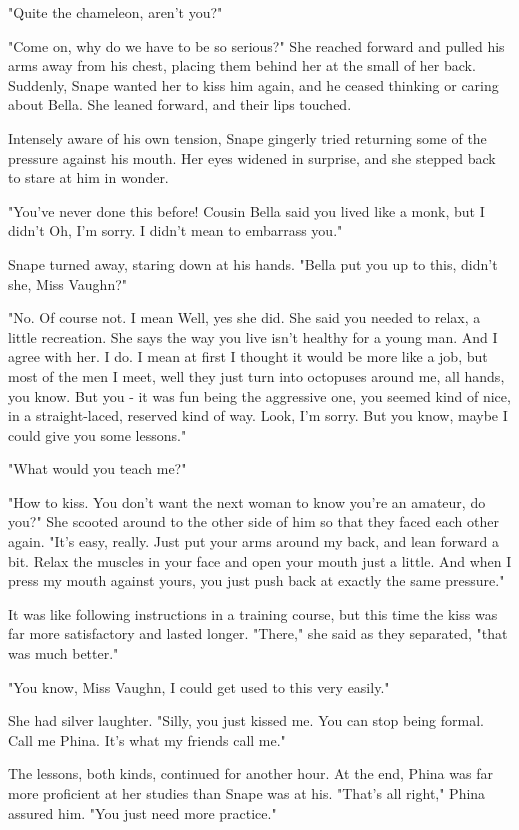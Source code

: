 "Quite the chameleon, aren't you?"

"Come on, why do we have to be so serious?" She reached forward and pulled his arms away from his chest, placing them behind her at the small of her back. Suddenly, Snape wanted her to kiss him again, and he ceased thinking or caring about Bella. She leaned forward, and their lips touched.

Intensely aware of his own tension, Snape gingerly tried returning some of the pressure against his mouth. Her eyes widened in surprise, and she stepped back to stare at him in wonder.

"You've never done this before! Cousin Bella said you lived like a monk, but I didn't{\el} Oh, I'm sorry. I didn't mean to embarrass you."

Snape turned away, staring down at his hands. "Bella put you up to this, didn't she, Miss Vaughn?"

"No. Of course not. I mean{\el} Well, yes she did. She said you needed to relax, a little recreation. She says the way you live isn't healthy for a young man. And I agree with her. I do. I mean at first I thought it would be more like a job, but most of the men I meet, well they just turn into octopuses around me, all hands, you know. But you - it was fun being the aggressive one, you seemed kind of nice, in a straight-laced, reserved kind of way. Look, I'm sorry. But you know, maybe I could give you some lessons."

"What would you teach me?"

"How to kiss. You don't want the next woman to know you're an amateur, do you?" She scooted around to the other side of him so that they faced each other again. "It's easy, really. Just put your arms around my back, and lean forward a bit. Relax the muscles in your face and open your mouth just a little. And when I press my mouth against yours, you just push back at exactly the same pressure."

It was like following instructions in a training course, but this time the kiss was far more satisfactory and lasted longer. "There," she said as they separated, "that was much better."

"You know, Miss Vaughn, I could get used to this very easily."

She had silver laughter. "Silly, you just kissed me. You can stop being formal. Call me Phina. It's what my friends call me."

The lessons, both kinds, continued for another hour. At the end, Phina was far more proficient at her studies than Snape was at his. "That's all right," Phina assured him. "You just need more practice."

